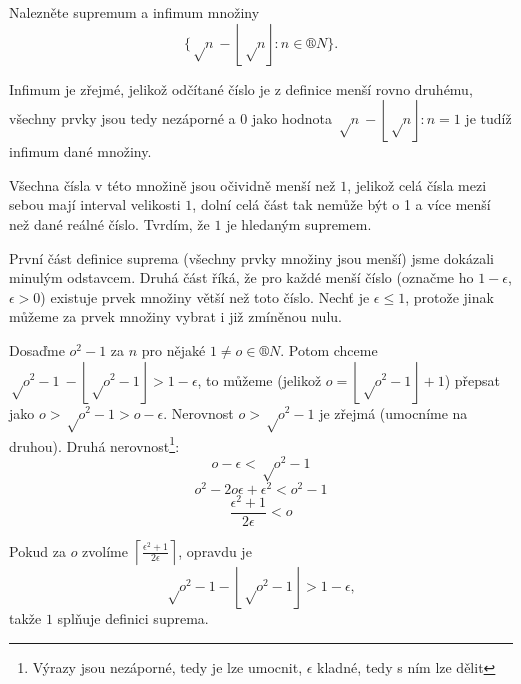 \documentclass[12pt]{article}					%
\begin{document}
\begin{priklad}
    Nalezněte supremum a infimum množiny
    $$ \{ √{n}\ −\left\lfloor√{n}\right\rfloor: n \in ®N \}. $$

    \begin{reseni}[Infimum]
        Infimum je zřejmé, jelikož odčítané číslo je z definice menší rovno druhému, všechny prvky jsou tedy nezáporné a $0$ jako hodnota $√{n}\ −\left\lfloor√{n}\right\rfloor: n=1$ je tudíž infimum dané množiny.
    \end{reseni}

    \begin{reseni}[Supremum]
        Všechna čísla v této množině jsou očividně menší než $1$, jelikož celá čísla mezi sebou mají interval velikosti $1$, dolní celá část tak nemůže být o 1 a více menší než dané reálné číslo. Tvrdím, že $1$ je hledaným supremem.

        První část definice suprema (všechny prvky množiny jsou menší) jsme dokázali minulým odstavcem. Druhá část říká, že pro každé menší číslo (označme ho $1-\epsilon$, $\epsilon > 0$) existuje prvek množiny větší než toto číslo. Nechť je $\epsilon ≤ 1$, protože jinak můžeme za prvek množiny vybrat i již zmíněnou nulu.

        Dosaďme $o^2 - 1$ za $n$ pro nějaké $1≠o \in ®N$. Potom chceme $√{o^2-1}\ −\left\lfloor√{o^2-1}\right\rfloor > 1-\epsilon$, to můžeme (jelikož $o = \left\lfloor√{o^2 - 1}\right\rfloor + 1$) přepsat jako $o > √{o^2-1} > o - \epsilon$. Nerovnost $o > √{o^2 - 1}$ je zřejmá (umocníme na druhou). Druhá nerovnost\footnote{Výrazy jsou nezáporné, tedy je lze umocnit, $\epsilon$ kladné, tedy s ním lze dělit}:
        $$ o-\epsilon < √{o^2 - 1} $$
        $$ o^2 - 2o\epsilon + \epsilon^2 < o^2 - 1 $$ 
        $$ \frac{\epsilon^2 + 1}{2\epsilon} < o $$

        Pokud za $o$ zvolíme $\left\lceil\frac{\epsilon^2 + 1}{2\epsilon}\right\rceil$, opravdu je
        $$ √{o^2-1} - \left\lfloor√{o^2-1}\right\rfloor > 1-\epsilon, $$
        takže $1$ splňuje definici suprema.
    \end{reseni}
\end{priklad}
\end{document}
